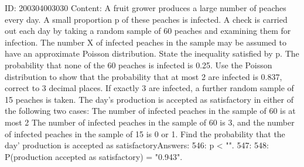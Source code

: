\documentclass{article}
\begin{document}
ID: 200304003030
Content:
A fruit grower produces a large number of peaches every day. A small proportion p of these peaches is infected. A check is carried out each day by taking a random sample of 60 peaches and examining them for infection. The number X of infected peaches in the sample may be assumed to have an approximate Poisson distribution. State the inequality satisfied by p. The probability that none of the 60 peaches is infected is 0.25. Use the Poisson distribution to show that the probability that at most 2 are infected is 0.837, correct to 3 decimal places. If exactly 3 are infected, a further random sample of 15 peaches is taken. The day's production is accepted as satisfactory in either of the following two cases: The number of infected peaches in the sample of 60 is at most 2  The number of infected peaches in the sample of 60 is 3, and the number of infected peaches in the sample of 15 is 0 or 1. Find the probability that the day' production is accepted as satisfactoryAnswers:
546: p < "".
547: 
548: P(production accepted as satisfactory) = "0.943".
\end{document}
